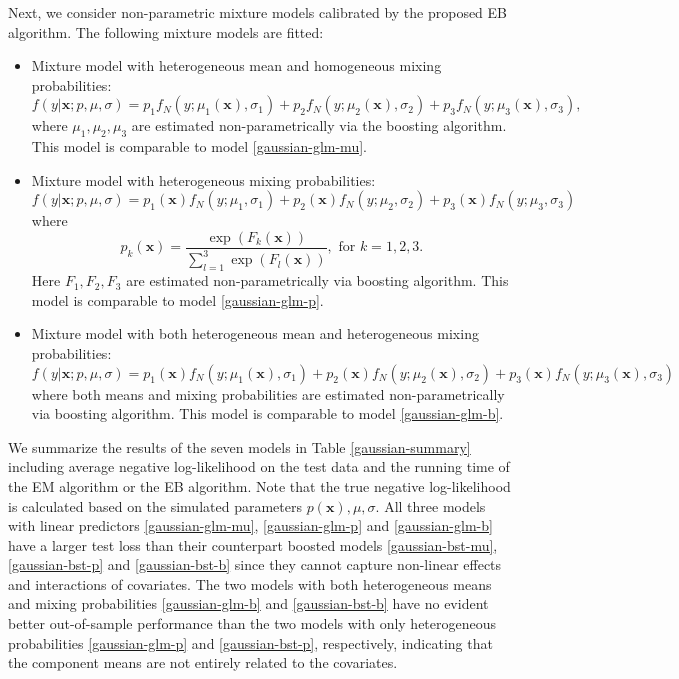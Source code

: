 \documentclass[11pt]{article}
\numberwithin{equation}{section}
\def\bx{\boldsymbol{x}}
\begin{document}
Next, we consider non-parametric mixture models calibrated by the proposed EB algorithm. The following mixture models are fitted:
\begin{itemize}
\item Mixture model with heterogeneous mean and homogeneous mixing probabilities:
\begin{equation}\label{gaussian-bst-mu}
	f(y|\bx;p,\mu,\sigma)=p_1f_N(y;\mu_1(\bx),\sigma_1)+p_2f_N(y;\mu_2(\bx),\sigma_2)+p_3f_N(y;\mu_3(\bx),\sigma_3),
\end{equation}
where $\mu_1,\mu_2,\mu_3$ are estimated non-parametrically via the boosting algorithm. This model is comparable to model \eqref{gaussian-glm-mu}.

\item Mixture model with heterogeneous mixing probabilities:
\begin{equation}\label{gaussian-bst-p}
	f(y|\bx;p,\mu,\sigma)=p_1(\bx)f_N(y;\mu_1,\sigma_1)+p_2(\bx)f_N(y;\mu_2,\sigma_2)+p_3(\bx)f_N(y;\mu_3,\sigma_3)
\end{equation}
where
\begin{equation}\label{bst-p}
	p_k(\bx)=\frac{\exp\left(F_k(\bx)\right)}{\sum_{l=1}^{3}\exp\left(F_l(\bx)\right)}, \text{ for } k=1,2,3.
\end{equation}
Here $F_1,F_2,F_3$ are estimated non-parametrically via boosting algorithm. This model is comparable to model \eqref{gaussian-glm-p}.

\item Mixture model with both heterogeneous mean and heterogeneous mixing probabilities:
\begin{equation}\label{gaussian-bst-b}
	f(y|\bx;p,\mu,\sigma)=p_1(\bx)f_N(y;\mu_1(\bx),\sigma_1)+p_2(\bx)f_N(y;\mu_2(\bx),\sigma_2)+p_3(\bx)f_N(y;\mu_3(\bx),\sigma_3)
\end{equation}
where both means and mixing probabilities are estimated non-parametrically via boosting algorithm. This model is comparable to model \eqref{gaussian-glm-b}.
\end{itemize}

We summarize the results of the seven models in Table \ref{gaussian-summary} including average negative log-likelihood on the test data and the running time of the EM algorithm or the EB algorithm. 
Note that the true negative log-likelihood is calculated based on the simulated parameters $p(\bx), \mu,\sigma$.
All three models with linear predictors  \eqref{gaussian-glm-mu}, \eqref{gaussian-glm-p} and \eqref{gaussian-glm-b} have a larger test loss 
than their counterpart boosted models \eqref{gaussian-bst-mu}, \eqref{gaussian-bst-p} and \eqref{gaussian-bst-b} 
since they cannot capture non-linear effects and interactions of covariates.
The two models with both heterogeneous means and mixing probabilities \eqref{gaussian-glm-b} and \eqref{gaussian-bst-b}  have no evident better out-of-sample performance than the two models with only heterogeneous probabilities \eqref{gaussian-glm-p} and \eqref{gaussian-bst-p}, respectively,
indicating that the component means are not entirely related to the covariates.
\end{document}
